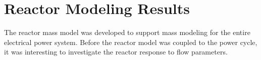 \section{Reactor Modeling Results}

The reactor mass model was developed to support mass modeling for the entire
electrical power system. Before the reactor model was coupled to the power
cycle, it was interesting to investigate the reactor response to flow
parameters.
